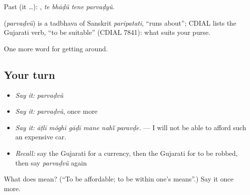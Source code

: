 Past (it …):    , \emph{te bhāḍũ tene parvaḍyũ}.

\begin{cousinweb}
\textbf{} (\emph{parvaḍvũ}) is a tadbhava of Sanskrit \emph{paripatati}, \textquotedblleft{}runs about\textquotedblright{}; CDIAL lists the Gujarati verb, \textquotedblleft{}to be suitable\textquotedblright{} (CDIAL 7841): what suits your purse.
\end{cousinweb}

\begin{grammarlens}[title={What you've built}]
One more word for getting around.
\end{grammarlens}

\subsection*{Your turn}
\begin{itemize}
\raggedright
  \item \emph{Say it:} \emph{parvaḍvũ}
  \item \emph{Say it:} \emph{parvaḍvũ}, once more
  \item \emph{Say it:} \emph{āṭlī mõghī gāḍī mane nahī̃ paravḍe.} — I will not be able to afford such an expensive car.
  \item \emph{Recall:} say the Gujarati for a currency, then the Gujarati for to be robbed, then say \emph{parvaḍvũ} again
\end{itemize}

\begin{tcolorbox}[breakable,colback=teal!4,colframe=teal!35!black,title={Before you move on}]
What does  mean? (\textquotedblleft{}To be affordable; to be within one's means\textquotedblright{}.) Say it once more.
\end{tcolorbox}

